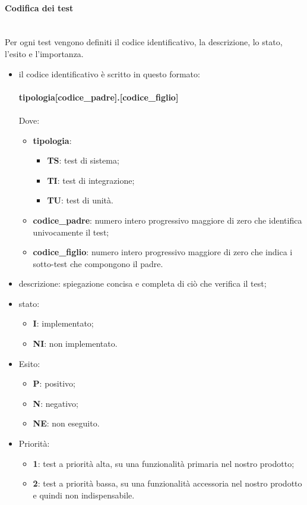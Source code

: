 \paragraph*{Codifica dei test} \mbox{} \\ [1mm]
Per ogni test vengono definiti il codice identificativo, la descrizione, lo stato, l'esito e l'importanza.
\begin{itemize}
	\item il codice identificativo è scritto in questo formato:\\
	\\ \textbf{tipologia[codice\_padre].[codice\_figlio]} \\
	\\ Dove:
	\begin{itemize}
		\item \textbf{tipologia}:
		\begin{itemize}
			\item \textbf{TS}: test di sistema;
			\item \textbf{TI}: test di integrazione;
			\item \textbf{TU}: test di unità.
		\end{itemize}
		\item \textbf{codice\_padre}: numero intero progressivo maggiore di zero che identifica univocamente il test;
		\item \textbf{codice\_figlio}: numero intero progressivo maggiore di zero che indica i sotto-test che compongono il padre. 
	\end{itemize}
	\item descrizione: spiegazione concisa e completa di ciò che verifica il test;
	\item stato:
	\begin{itemize}
		\item \textbf{I}: implementato;
		\item \textbf{NI}: non implementato.
	\end{itemize}
	\item Esito:
	\begin{itemize}
		\item \textbf{P}: positivo;
		\item \textbf{N}: negativo;
		\item \textbf{NE}: non eseguito.
	\end{itemize}
	\item Priorità:
	\begin{itemize}
		\item \textbf{1}: test a priorità alta, su una funzionalità primaria nel nostro prodotto;
		\item \textbf{2}: test a priorità bassa, su una funzionalità accessoria nel nostro prodotto e quindi non indispensabile.
	\end{itemize}
\end{itemize}

